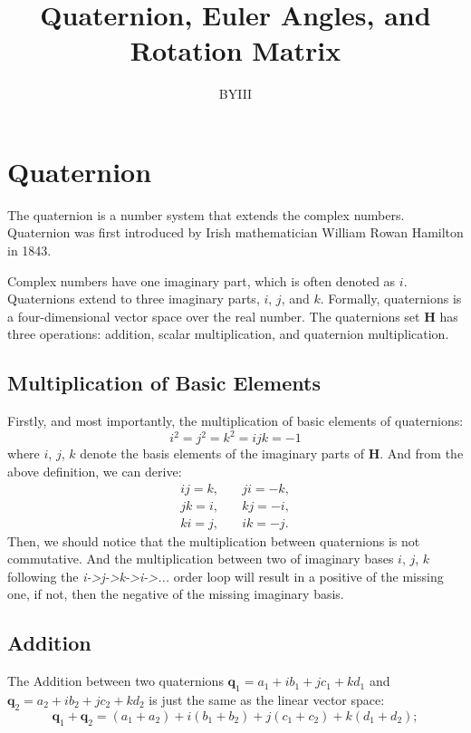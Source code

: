\documentclass{article}
\begin{document}
\author{BYIII}
\title{Quaternion, Euler Angles, and Rotation Matrix}
\date{}

\maketitle

\section{Quaternion}
The quaternion is a number system that extends the complex numbers. Quaternion was first introduced by Irish mathematician William Rowan Hamilton in 1843.

Complex numbers have one imaginary part, which is often denoted as $i$. Quaternions extend to three imaginary parts, $i$, $j$, and $k$. Formally, quaternions is a four-dimensional vector space over the real number. The quaternions set \textbf{H} has three operations: addition, scalar multiplication, and quaternion multiplication.

\subsection*{Multiplication of Basic Elements}
Firstly, and most importantly, the multiplication of basic elements of quaternions:
\begin{displaymath}
i^2 = j^2 = k^2 = ijk = -1
\end{displaymath}
where $i$, $j$, $k$ denote the basis elements of the imaginary parts of \textbf{H}. And from the above definition, we can derive:
\begin{displaymath}
\begin{split}
ij = k, &\quad ji = -k, \\
jk = i, &\quad kj = -i, \\
ki = j, &\quad ik = -j.
\end{split}
\end{displaymath}
Then, we should notice that the multiplication between quaternions is not commutative. And the multiplication between two of imaginary bases $i$, $j$, $k$ following the \textit{i->j->k->i->...} order loop will result in a positive of the missing one, if not, then the negative of the missing imaginary basis.

\subsection*{Addition}
The Addition between two quaternions $\mathbf{q}_1 = a_1 + ib_1+jc_1+kd_1$ and $\mathbf{q}_2 = a_2 + ib_2+jc_2+kd_2$ is just the same as the linear vector space:
\begin{displaymath}
\mathbf{q}_1 + \mathbf{q}_2 = (a_1+a_2) + i(b_1+b_2) + j(c_1+c_2) + k(d_1+d_2);
\end{displaymath}
\end{document}
